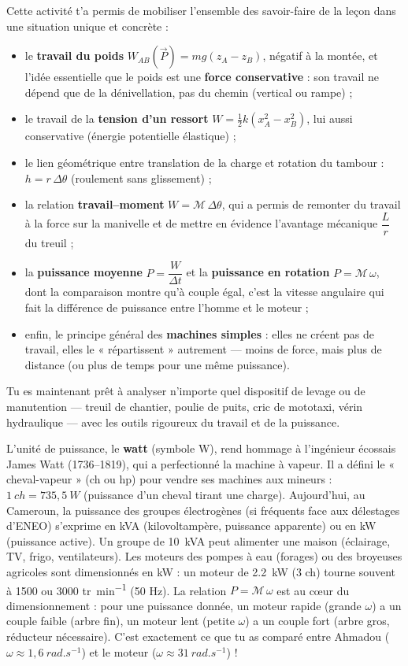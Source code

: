 \documentclass[11pt]{article}
\begin{document}
Cette activité t'a permis de mobiliser l'ensemble des savoir-faire de la leçon dans une situation unique et concrète :
\begin{itemize}
\item le \textbf{travail du poids} $W_{AB}(\vec{P}) = mg(z_A - z_B)$, négatif à la montée, et l'idée essentielle que le poids est une \textbf{force conservative} : son travail ne dépend que de la dénivellation, pas du chemin (vertical ou rampe) ;
\item le travail de la \textbf{tension d'un ressort} $W = \frac{1}{2}k(x_A^2 - x_B^2)$, lui aussi conservative (énergie potentielle élastique) ;
\item le lien géométrique entre translation de la charge et rotation du tambour : $h = r\,\Delta\theta$ (roulement sans glissement) ;
\item la relation \textbf{travail--moment} $W = \mathcal{M}\,\Delta\theta$, qui a permis de remonter du travail à la force sur la manivelle et de mettre en évidence l'avantage mécanique $\dfrac{L}{r}$ du treuil ;
\item la \textbf{puissance moyenne} $P = \dfrac{W}{\Delta t}$ et la \textbf{puissance en rotation} $P = \mathcal{M}\,\omega$, dont la comparaison montre qu'à couple égal, c'est la vitesse angulaire qui fait la différence de puissance entre l'homme et le moteur ;
\item enfin, le principe général des \textbf{machines simples} : elles ne créent pas de travail, elles le « répartissent » autrement — moins de force, mais plus de distance (ou plus de temps pour une même puissance).
\end{itemize}
Tu es maintenant prêt à analyser n'importe quel dispositif de levage ou de manutention — treuil de chantier, poulie de puits, cric de mototaxi, vérin hydraulique — avec les outils rigoureux du travail et de la puissance.

\begin{savaistu}
L'unité de puissance, le \textbf{watt} (symbole \si{W}), rend hommage à l'ingénieur écossais James Watt (1736--1819), qui a perfectionné la machine à vapeur. Il a défini le « cheval-vapeur » (\si{ch} ou \si{hp}) pour vendre ses machines aux mineurs : $1\ \si{ch} = 735,5\ \si{W}$ (puissance d'un cheval tirant une charge). Aujourd'hui, au Cameroun, la puissance des groupes électrogènes (si fréquents face aux délestages d'ENEO) s'exprime en \si{kVA} (kilovoltampère, puissance apparente) ou en \si{kW} (puissance active). Un groupe de \SI{10}{kVA} peut alimenter une maison (éclairage, TV, frigo, ventilateurs). Les moteurs des pompes à eau (forages) ou des broyeuses agricoles sont dimensionnés en \si{kW} : un moteur de \SI{2,2}{kW} (3 ch) tourne souvent à 1500 ou 3000 \si{tr.min^{-1}} (50 Hz). La relation $P = \mathcal{M}\,\omega$ est au cœur du dimensionnement : pour une puissance donnée, un moteur rapide (grande $\omega$) a un couple faible (arbre fin), un moteur lent (petite $\omega$) a un couple fort (arbre gros, réducteur nécessaire). C'est exactement ce que tu as comparé entre Ahmadou ($\omega \approx 1,6\ \si{rad.s^{-1}}$) et le moteur ($\omega \approx 31\ \si{rad.s^{-1}}$) !
\end{savaistu}
\end{document}
